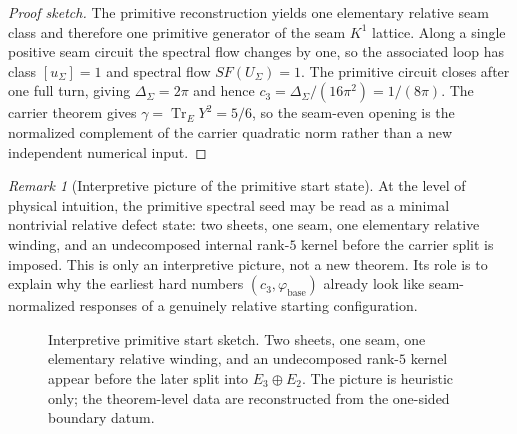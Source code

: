\documentclass[11pt,a4paper]{article}
\theoremstyle{definition}
\theoremstyle{remark}
\newtheorem*{remark}{Remark}
\DeclareMathOperator{\tr}{Tr}
\DeclareMathOperator{\rank}{rank}
\newcommand{\Seam}{\Sigma}
\newcommand{\cthree}{c_3}
\newcommand{\phibase}{\varphi_{\mathrm{base}}}
\begin{document}
\begin{proof}[Proof sketch]
The primitive reconstruction yields one elementary relative seam class and therefore one primitive
generator of the seam $K^1$ lattice. Along a single positive seam circuit the spectral flow changes
by one, so the associated loop has class $[u_\Sigma]=1$ and spectral flow $SF(U_\Seam)=1$. The
primitive circuit closes after one full turn, giving $\Delta_\Seam=2\pi$ and hence
$\cthree=\Delta_\Seam/(16\pi^2)=1/(8\pi)$. The carrier theorem gives
$\gamma=\tr_EY^2=5/6$, so the seam-even opening is the normalized complement of the carrier
quadratic norm rather than a new independent numerical input.
\end{proof}

\begin{remark}[Interpretive picture of the primitive start state]
At the level of physical intuition, the primitive spectral seed may be read as a minimal nontrivial relative defect state: two sheets, one seam, one elementary relative winding, and an undecomposed internal rank-$5$ kernel before the carrier split is imposed. This is only an interpretive picture, not a new theorem. Its role is to explain why the earliest hard numbers $(\cthree,\phibase)$ already look like seam-normalized responses of a genuinely relative starting configuration.
\end{remark}

\begin{figure}[t]
\centering
\scriptsize
{}
\caption{Interpretive primitive start sketch. Two sheets, one seam, one elementary relative winding,
and an undecomposed rank-$5$ kernel appear before the later split into $E_3\oplus E_2$.
The picture is heuristic only; the theorem-level data are reconstructed from the one-sided
boundary datum.}
\label{fig:primitive-start-sketch}
\end{figure}
\end{document}
